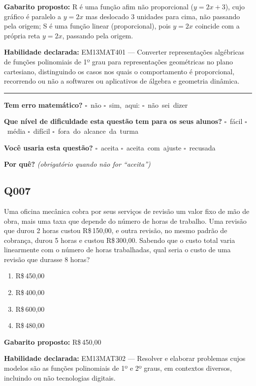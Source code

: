 \documentclass[11pt,a4paper]{article}
\begin{document}
\begin{samepage}
\textbf{Gabarito proposto:} R é uma função afim não proporcional ($y=2x+3$), cujo gráfico é paralelo a $y=2x$ mas deslocado 3 unidades para cima, não passando pela origem; S é uma função linear (proporcional), pois $y=2x$ coincide com a própria reta $y=2x$, passando pela origem.

\textbf{Habilidade declarada:} EM13MAT401 --- Converter representações algébricas de funções polinomiais de 1º grau para representações geométricas no plano cartesiano, distinguindo os casos nos quais o comportamento é proporcional, recorrendo ou não a softwares ou aplicativos de álgebra e geometria dinâmica.
\end{samepage}

\noindent\rule{\linewidth}{0.4pt}
\textbf{Tem erro matemático?}\quad
\mbox{$\square$~não} \quad \mbox{$\square$~sim, aqui:} \underline{\hspace{5cm}}
\quad \mbox{$\square$~não sei dizer}

\textbf{Que nível de dificuldade esta questão tem para os seus alunos?}\quad
\mbox{$\square$~fácil} \quad \mbox{$\square$~média} \quad
\mbox{$\square$~difícil} \quad \mbox{$\square$~fora do alcance da turma}

\textbf{Você usaria esta questão?}\quad
\mbox{$\square$~aceita} \quad \mbox{$\square$~aceita com ajuste} \quad
\mbox{$\square$~recusada}

\textbf{Por quê?} \emph{(obrigatório quando não for ``aceita'')}

\underline{\hspace{\linewidth}}

\underline{\hspace{\linewidth}}
\vspace{0.6em}

\begin{samepage}
\subsection*{Q007}
Uma oficina mecânica cobra por seus serviços de revisão um valor fixo de mão de obra, mais uma taxa que depende do número de horas de trabalho. Uma revisão que durou 2 horas custou R\$\,150,00, e outra revisão, no mesmo padrão de cobrança, durou 5 horas e custou R\$\,300,00. Sabendo que o custo total varia linearmente com o número de horas trabalhadas, qual seria o custo de uma revisão que durasse 8 horas?
\begin{enumerate}[label=(\alph*),nosep,leftmargin=*]
\item R\$\,450,00
\item R\$\,400,00
\item R\$\,600,00
\item R\$\,480,00
\end{enumerate}

\textbf{Gabarito proposto:} R\$\,450,00

\textbf{Habilidade declarada:} EM13MAT302 --- Resolver e elaborar problemas cujos modelos são as funções polinomiais de 1º e 2º graus, em contextos diversos, incluindo ou não tecnologias digitais.
\end{samepage}
\end{document}
